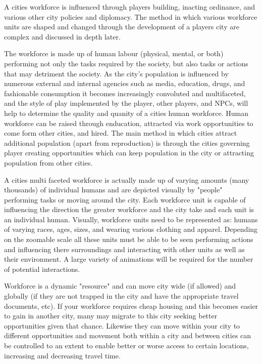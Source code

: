 A cities workforce is influenced through players building, inacting ordinance, and various other  city policies and diplomacy. The method in which various workforce units are shaped and changed through the development of a players city are complex and discussed in depth later.

The workforce is made up of human labour (physical, mental, or both) performing not only the tasks required by the society, but also tasks or actions that may detriment the society. As the city's population is influenced by numerous external and internal agencies such as media, education, drugs, and fashionable consumption it becomes increasingly convoluted and multifaceted, and the style of play implemented by the player, other players, and NPCs, will help to determine the quality and quanity of a cities human workforce. Human workforce can be raised through enducation, attracted via work opportunities to come form other cities, and hired. The main method in which cities attract additional population (apart from reproduction) is through the cities governing player creating opportunities which can keep population in the city or attracting population from other cities.


A cities multi faceted workforce is actually made up of varying amounts (many thousands) of individual humans and are depicted visually by "people" performing tasks or moving around the city. Each workforce unit is capable of influencing the direction the greater workforce and the city take and each unit is an individual human. Visually, workforce units need to be represented as: humans of varying races, ages, sizes, and wearing various clothing and apparel. Depending on the zoomable scale all these units must be able to be seen performing actions and influencing there surroundings and interacting with other units as well as their environment. A large variety of animations will be required for the number of potential interactions. 


Workforce is a dynamic "resource" and can move city wide (if allowed) and globally (if they are not trapped in the city and have the appropriate travel documents, etc). If your workforce requires cheap housing and this becomes easier to gain in another city, many may migrate to this city seeking better opportunities given that chance. Likewise they can move within your city to different opportunities and movement both within a city and between cities can be controlled to an extent to enable better or worse access to certain locations, increasing and decreasing travel time.

